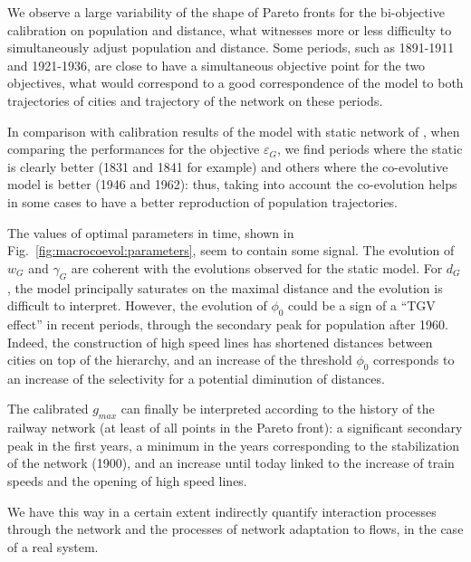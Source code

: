 We observe a large variability of the shape of Pareto fronts for the bi-objective calibration on population and distance, what witnesses more or less difficulty to simultaneously adjust population and distance. Some periods, such as 1891-1911 and 1921-1936, are close to have a simultaneous objective point for the two objectives, what would correspond to a good correspondence of the model to both trajectories of cities and trajectory of the network on these periods. 

In comparison with calibration results of the model with static network of \cite{raimbault2018indirect}, when comparing the performances for the objective $\varepsilon_G$, we find periods where the static is clearly better (1831 and 1841 for example) and others where the co-evolutive model is better (1946 and 1962): thus, taking into account the co-evolution helps in some cases to have a better reproduction of population trajectories.


The values of optimal parameters in time, shown in Fig.~\ref{fig:macrocoevol:parameters}, seem to contain some signal. The evolution of $w_G$ and $\gamma_G$ are coherent with the evolutions observed for the static model. For $d_G$, the model principally saturates on the maximal distance and the evolution is difficult to interpret. However, the evolution of $\phi_0$ could be a sign of a ``TGV effect'' in recent periods, through the secondary peak for population after 1960. Indeed, the construction of high speed lines has shortened distances between cities on top of the hierarchy, and an increase of the threshold $\phi_0$ corresponds to an increase of the selectivity for a potential diminution of distances.


The calibrated $g_{max}$ can finally be interpreted according to the history of the railway network (at least of all points in the Pareto front): a significant secondary peak in the first years, a minimum in the years corresponding to the stabilization of the network (1900), and an increase until today linked to the increase of train speeds and the opening of high speed lines. 


We have this way in a certain extent indirectly quantify interaction processes through the network and the processes of network adaptation to flows, in the case of a real system.


